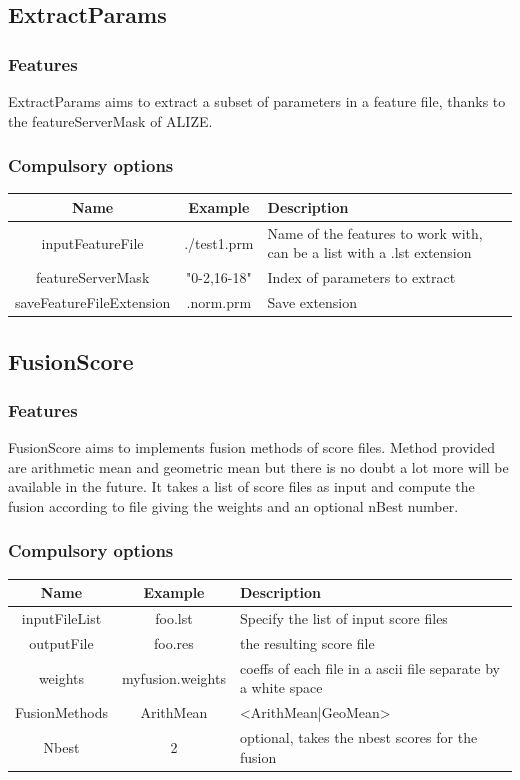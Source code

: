 \documentclass[a4paper]{article}
\begin{document}
\subsection{ExtractParams}

\subsubsection{Features}
ExtractParams aims to extract a subset of parameters in a feature file, thanks to the featureServerMask of ALIZE.

\subsubsection{Compulsory options}

\begin{tabular}{|c|c||p{8cm}|}
\hline Name & Example & Description\\
\hline
\hline inputFeatureFile & ./test1.prm & Name of the features to work with, can be a list with a .lst extension\\
\hline featureServerMask & "0-2,16-18" & Index of parameters to extract\\
\hline saveFeatureFileExtension & .norm.prm & Save extension\\
\hline
\end{tabular}

\subsection{FusionScore}

\subsubsection{Features}
FusionScore aims to implements fusion methods of score files. Method provided are arithmetic mean and geometric mean but there is no doubt a lot more will be available in the future.
It takes a list of score files as input and compute the fusion according to file giving the weights and an optional nBest number.

\subsubsection{Compulsory options}

\begin{tabular}{|c|c||p{8cm}|}
\hline Name & Example & Description\\
\hline
\hline inputFileList & foo.lst & Specify the list of input score files\\
\hline outputFile & foo.res & the resulting score file\\
\hline weights & myfusion.weights & coeffs of each file in a ascii file separate by a white space\\
\hline FusionMethods & ArithMean & <ArithMean|GeoMean>\\
\hline Nbest & 2 & optional, takes the nbest scores for the fusion\\
\hline
\end{tabular}
\end{document}
